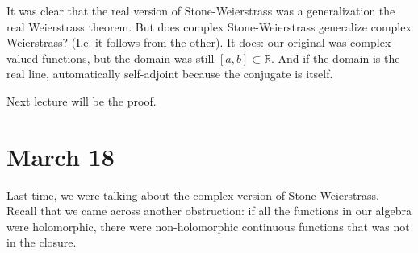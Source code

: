 \documentclass{article}
\theoremstyle{plain}
\theoremstyle{remark}
\newcommand{\R}{{\mathbb R}}
\begin{document}
It was clear that the real version of Stone-Weierstrass was a generalization
the real Weierstrass theorem.
But does complex Stone-Weierstrass generalize complex Weierstrass?
(I.e. it follows from the other).
It does: our original was complex-valued functions,
but the domain was still $[a,b] \subset \R$.
And if the domain is the real line, automatically self-adjoint
because the conjugate is itself.

Next lecture will be the proof.


\section{March 18}
Last time, we were talking about the complex version of Stone-Weierstrass.
Recall that we came across another obstruction:
if all the functions in our algebra were holomorphic,
there were non-holomorphic continuous functions that was not in the closure.
\end{document}
